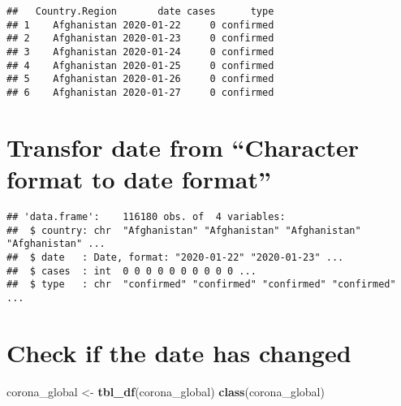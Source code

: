 \documentclass[
]{article}
\newenvironment{Shaded}{\begin{snugshade}}{\end{snugshade}}
\newcommand{\DataTypeTok}[1]{\textcolor[rgb]{0.13,0.29,0.53}{#1}}
\newcommand{\KeywordTok}[1]{\textcolor[rgb]{0.13,0.29,0.53}{\textbf{#1}}}
\newcommand{\NormalTok}[1]{#1}
\newcommand{\OperatorTok}[1]{\textcolor[rgb]{0.81,0.36,0.00}{\textbf{#1}}}
\newcommand{\StringTok}[1]{\textcolor[rgb]{0.31,0.60,0.02}{#1}}
\begin{document}
\begin{verbatim}
##   Country.Region       date cases      type
## 1    Afghanistan 2020-01-22     0 confirmed
## 2    Afghanistan 2020-01-23     0 confirmed
## 3    Afghanistan 2020-01-24     0 confirmed
## 4    Afghanistan 2020-01-25     0 confirmed
## 5    Afghanistan 2020-01-26     0 confirmed
## 6    Afghanistan 2020-01-27     0 confirmed
\end{verbatim}

\hypertarget{transfor-date-from-character-format-to-date-format}{%
\section{Transfor date from ``Character format to date
format''}\label{transfor-date-from-character-format-to-date-format}}

\begin{Shaded}
\end{Shaded}

\begin{verbatim}
## 'data.frame':    116180 obs. of  4 variables:
##  $ country: chr  "Afghanistan" "Afghanistan" "Afghanistan" "Afghanistan" ...
##  $ date   : Date, format: "2020-01-22" "2020-01-23" ...
##  $ cases  : int  0 0 0 0 0 0 0 0 0 0 ...
##  $ type   : chr  "confirmed" "confirmed" "confirmed" "confirmed" ...
\end{verbatim}

\hypertarget{check-if-the-date-has-changed}{%
\section{Check if the date has
changed}\label{check-if-the-date-has-changed}}

\begin{Shaded}
\begin{Highlighting}[]
\NormalTok{corona_global <-}\StringTok{ }\KeywordTok{tbl_df}\NormalTok{(corona_global)}
\KeywordTok{class}\NormalTok{(corona_global)}
\end{Highlighting}
\end{Shaded}
\end{document}
